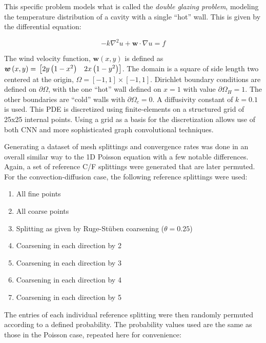 \documentclass[review]{siamart190516}
\renewcommand{\vec}[1]{\bm{{#1}}}
\newcommand{\grad}{\nabla}
\begin{document}
This specific problem models what is called the \textit{double glazing problem}, modeling the temperature distribution of a cavity with a single ``hot'' wall.  This is given by the differential equation:

\begin{equation}\label{eqn:conv}
  -k\grad^2u + \vec{w}\cdot\grad u = f
\end{equation}

The wind velocity function, $\vec{w}\left(x,y\right)$ is defined as $\vec{w}\left(x,y\right)=\\ \begin{bmatrix} 2y\left(1-x^2\right) & 2x\left(1-y^2\right) \end{bmatrix}$.  The domain is a square of side length two centered at the origin, $\Omega = \left[-1,1\right] \times \left[-1,1\right]$.  Dirichlet boundary conditions are defined on $\partial \Omega$, with the one ``hot'' wall defined on $x=1$ with value $\partial \Omega_H=1$.  The other boundaries are ``cold'' walls with $\partial \Omega_c=0$.  A diffusivity constant of $k=0.1$ is used. This PDE is discretized using finite-elements on a structured grid of 25x25 internal points.  Using a grid as a basis for the discretization allows use of both CNN and more sophisticated graph convolutional techniques.

Generating a dataset of mesh splittings and convergence rates was done in an overall similar way to the 1D Poisson equation with a few notable differences.  Again, a set of reference C/F splittings were generated that are later permuted.  For the convection-diffusion case, the following reference splittings were used:

\begin{enumerate}
\item All fine points
\item All coarse points
\item Splitting as given by Ruge-St\"{u}ben coarsening ($\theta=0.25$)
\item Coarsening in each direction by 2
\item Coarsening in each direction by 3
\item Coarsening in each direction by 4
\item Coarsening in each direction by 5
\end{enumerate}

The entries of each individual reference splitting were then randomly permuted according to a defined probability.  The probability values used are the same as those in the Poisson case, repeated here for convenience:
\end{document}
